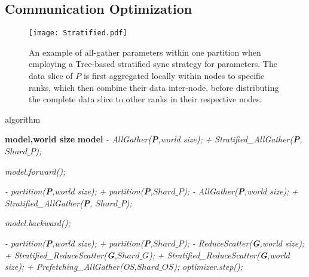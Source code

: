 
\subsection{Communication Optimization}

\begin{figure}[t]
    \centering
    \texttt{[image: Stratified.pdf]}
    \caption{An example of all-gather parameters within one partition when employing a Tree-based stratified sync strategy for parameters. The data slice of $P$ is first aggregated locally within nodes to specific ranks, which then combine their data inter-node, before distributing the complete data slice to other ranks in their respective nodes.}
    \label{sync}
\end{figure}


\begin{algorithm}[t]
    \caption{\SysName algorithm}
    \small
    \label{Lins_alg}
    \begin{algorithmic}[1]
        \Input \textbf{model,world size}
        \Output \textbf{model}
        \State \emph{- AllGather(\textbf{P},world size);}
        \State \emph{+ Stratified\_AllGather(\textbf{P}, $Shard\_P$);}

        \State \emph{model.forward();}
 
        \State \emph{- partition(\textbf{P},world size);}
        \State \emph{+ partition(\textbf{P},$Shard\_P$);}
        \State \emph{- AllGather(\textbf{P},world size);}
        \State \emph{+ Stratified\_AllGather(\textbf{P}, $Shard\_P$);}

        \State \emph{model.backward();}

        \State \emph{- partition(\textbf{P},world size);}
        \State \emph{+ partition(\textbf{P},$Shard\_P$);}
        \State \emph{- ReduceScatter(\textbf{G},world size);}
            \State \emph{+ Stratified\_ReduceScatter(\textbf{G},$Shard\_G$);}
            \EndWhile
        \State \emph{+ Stratified\_ReduceScatter(\textbf{G},world size);}
            \State \emph{+ Prefetching\_AllGather(OS,$Shard\_OS$);}
            \EndIf
        \State \emph{optimizer.step();}

        \EndWhile
    \end{algorithmic}
\end{algorithm}

